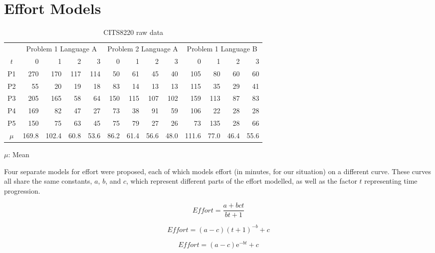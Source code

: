 \documentclass[a4paper,10pt]{article}
\begin{document}
\section{Effort Models}
\begin{table}
  \centering
  \begin{threeparttable}
  \begin{tabular}{|c|rrrr|rrrr|rrrr|}
  \hline
 & \multicolumn{4}{|c|}{Problem 1 Language A} & \multicolumn{4}{|c|}{Problem 2 Language A} & \multicolumn{4}{|c|}{Problem 1 Language B} \\
$t$ & 0 & 1 & 2 & 3 & 0 & 1 & 2 & 3 & 0 & 1 & 2 & 3 \\ \hline
P1 & 270 & 170 & 117 & 114 & 50 & 61 & 45 & 40 & 105 & 80 & 60 & 60 \\
P2 & 55 & 20 & 19 & 18 & 83 & 14 & 13 & 13 & 115 & 35 & 29 & 41 \\
P3 & 205 & 165 & 58 & 64 & 150 & 115 & 107 & 102 & 159 & 113 & 87 & 83 \\
P4 & 169 & 82 & 47 & 27 & 73 & 38 & 91 & 59 & 106 & 22 & 28 & 28 \\
P5 & 150 & 75 & 63 & 45 & 75 & 79 & 27 & 26 & 73 & 135 & 28 & 66 \\ \hline
$\mu$ & 169.8 & 102.4 & 60.8 & 53.6 & 86.2 & 61.4 & 56.6 & 48.0 & 111.6 & 77.0 & 46.4 & 55.6 \\ \hline
  \end{tabular}
  \begin{tablenotes}
      \item $\mu$: Mean
  \end{tablenotes}
  \caption{CITS8220 raw data}
  \label{tab:rawdata}
  \end{threeparttable}
\end{table}
Four separate models for effort were proposed, each of which models effort (in minutes, for our situation) on a different curve. These curves all share the same constants, $a$, $b$, and $c$, which represent different parts of the effort modelled, as well as the factor $t$ representing time progression.

\begin{equation} \label{eq:1}
\textit{Effort} = \frac{a+bct}{bt+1}\tag{A}
\end{equation}

\begin{equation} \label{eq:2}
\textit{Effort} = (a-c)(t+1)^{-b}+c\tag{B}
\end{equation}

\begin{equation} \label{eq:3}
\textit{Effort} = (a-c) \mathrm{e}^{-bt} +c\tag{C}
\end{equation}
\end{document}
